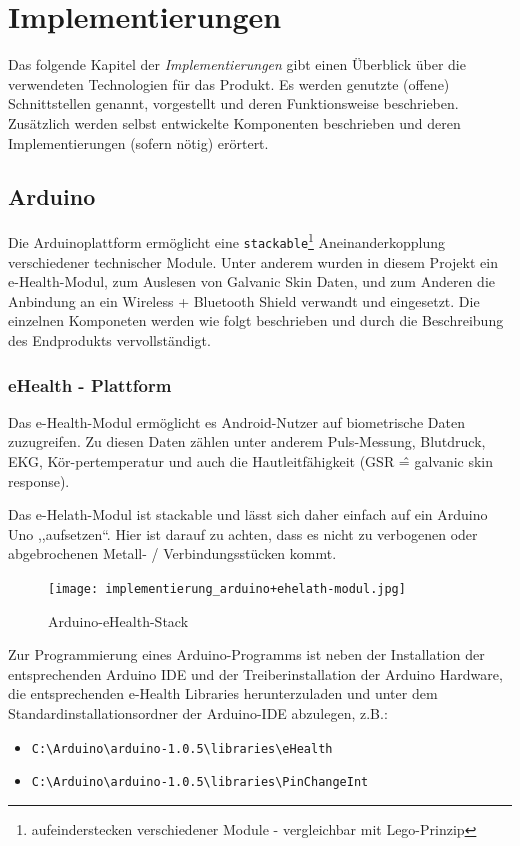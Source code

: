    	\newpage
	\section{Implementierungen}

	Das folgende Kapitel der \textit{Implementierungen} gibt einen Überblick über die verwendeten Technologien für das Produkt. Es werden genutzte (offene) Schnittstellen genannt, vorgestellt und deren Funktionsweise beschrieben. Zusätzlich werden selbst entwickelte Komponenten beschrieben und deren Implementierungen (sofern nötig) erörtert.
	
	\subsection{Arduino}
	
	Die Arduinoplattform ermöglicht eine \texttt{stackable}\footnote{aufeinderstecken verschiedener Module - vergleichbar mit Lego-Prinzip} Aneinanderkopplung verschiedener technischer Module. Unter anderem wurden in diesem Projekt ein e-Health-Modul, zum Auslesen von Galvanic Skin Daten, und zum Anderen die Anbindung an ein Wireless + Bluetooth Shield verwandt und eingesetzt. Die einzelnen Komponeten werden wie folgt beschrieben und durch die Beschreibung des Endprodukts vervollständigt.
		
	\subsubsection{eHealth - Plattform}
	
	Das e-Health-Modul ermöglicht es Android-Nutzer auf biometrische Daten zuzugreifen. Zu diesen Daten zählen unter anderem Puls-Messung, Blutdruck, EKG, Kör-pertemperatur und auch die Hautleitfähigkeit (GSR \^= galvanic skin response).

	Das e-Helath-Modul ist stackable und lässt sich daher einfach auf ein Arduino Uno ,,aufsetzen``. Hier ist darauf zu achten, dass es nicht zu verbogenen oder abgebrochenen Metall- / Verbindungsstücken kommt.
	
	\begin{figure}[hbtp]
	\centering
	\texttt{[image: implementierung\_arduino+ehelath-modul.jpg]}
	\caption{Arduino-eHealth-Stack}
	\label{fig:Arduino-eHealth-Stack}
	\end{figure}
	
	
	Zur Programmierung eines Arduino-Programms ist neben der Installation der entsprechenden Arduino IDE und der Treiberinstallation der Arduino Hardware, die entsprechenden e-Health Libraries herunterzuladen und unter dem Standardinstallationsordner der Arduino-IDE abzulegen, z.B.:
	\begin{itemize}
	\item \texttt{C:\textbackslash Arduino\textbackslash arduino-1.0.5\textbackslash libraries\textbackslash eHealth}
	\item \texttt{C:\textbackslash Arduino\textbackslash arduino-1.0.5\textbackslash libraries\textbackslash PinChangeInt}
	\end{itemize}
	
